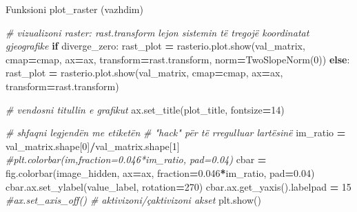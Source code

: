 \documentclass[
  ignorenonframetext,
]{beamer}
\newenvironment{Shaded}{\begin{snugshade}}{\end{snugshade}}
\newcommand{\CommentTok}[1]{\textcolor[rgb]{0.56,0.35,0.01}{\textit{#1}}}
\newcommand{\ControlFlowTok}[1]{\textcolor[rgb]{0.13,0.29,0.53}{\textbf{#1}}}
\newcommand{\DecValTok}[1]{\textcolor[rgb]{0.00,0.00,0.81}{#1}}
\newcommand{\FloatTok}[1]{\textcolor[rgb]{0.00,0.00,0.81}{#1}}
\newcommand{\NormalTok}[1]{#1}
\newcommand{\OperatorTok}[1]{\textcolor[rgb]{0.81,0.36,0.00}{\textbf{#1}}}
\begin{document}
\begin{frame}[fragile]{Funksioni plot\_raster (vazhdim)}
\protect\hypertarget{funksioni-plot_raster-vazhdim}{}

\begin{Shaded}
\begin{Highlighting}[]
    \CommentTok{\# vizualizoni raster: rast.transform lejon sistemin të tregojë koordinatat gjeografike}
    \ControlFlowTok{if}\NormalTok{ diverge\_zero:}
\NormalTok{        rast\_plot }\OperatorTok{=}\NormalTok{ rasterio.plot.show(val\_matrix, cmap}\OperatorTok{=}\NormalTok{cmap, ax}\OperatorTok{=}\NormalTok{ax, transform}\OperatorTok{=}\NormalTok{rast.transform, norm}\OperatorTok{=}\NormalTok{TwoSlopeNorm(}\DecValTok{0}\NormalTok{))}
    \ControlFlowTok{else}\NormalTok{: }
\NormalTok{        rast\_plot }\OperatorTok{=}\NormalTok{ rasterio.plot.show(val\_matrix, cmap}\OperatorTok{=}\NormalTok{cmap, ax}\OperatorTok{=}\NormalTok{ax, transform}\OperatorTok{=}\NormalTok{rast.transform)}
    
    \CommentTok{\# vendosni titullin e grafikut}
\NormalTok{    ax.set\_title(plot\_title, fontsize}\OperatorTok{=}\DecValTok{14}\NormalTok{)}
    
    \CommentTok{\# shfaqni legjendën me etiketën}
    \CommentTok{\# "hack" për të rregulluar lartësinë}
\NormalTok{    im\_ratio }\OperatorTok{=}\NormalTok{ val\_matrix.shape[}\DecValTok{0}\NormalTok{]}\OperatorTok{/}\NormalTok{val\_matrix.shape[}\DecValTok{1}\NormalTok{] }
    \CommentTok{\#plt.colorbar(im,fraction=0.046*im\_ratio, pad=0.04)}
\NormalTok{    cbar }\OperatorTok{=}\NormalTok{ fig.colorbar(image\_hidden, ax}\OperatorTok{=}\NormalTok{ax, fraction}\OperatorTok{=}\FloatTok{0.046}\OperatorTok{*}\NormalTok{im\_ratio, pad}\OperatorTok{=}\FloatTok{0.04}\NormalTok{)}
\NormalTok{    cbar.ax.set\_ylabel(value\_label, rotation}\OperatorTok{=}\DecValTok{270}\NormalTok{)}
\NormalTok{    cbar.ax.get\_yaxis().labelpad }\OperatorTok{=} \DecValTok{15}
    \CommentTok{\#ax.set\_axis\_off() \# aktivizoni/çaktivizoni akset}
\NormalTok{    plt.show()}
\end{Highlighting}
\end{Shaded}
\end{frame}
\end{document}
